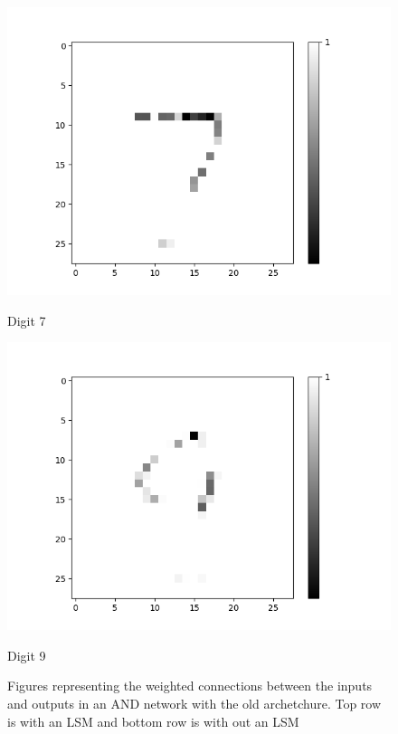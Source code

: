 \begin{figure}[H]
\begin{minipage}[b]{0.19\textwidth}
		\includegraphics[width=\textwidth]{AND-OLD(NO-LSM)/Layer0-Neuron-7.png}
		\caption{Digit 7}
	\end{minipage}
	\begin{minipage}[b]{0.19\textwidth}
		\captionsetup{labelformat=empty}
		\includegraphics[width=\textwidth]{AND-OLD(NO-LSM)/Layer0-Neuron-9.png}
		\caption{Digit 9}
	\end{minipage}
	\hfill
	\caption{Figures representing the weighted connections between the inputs and outputs in an AND network with the old archetchure. Top row is with an LSM and bottom row is with out an LSM}
	\label{fig:and-net-old-archetchure-interp}
\end{figure}

